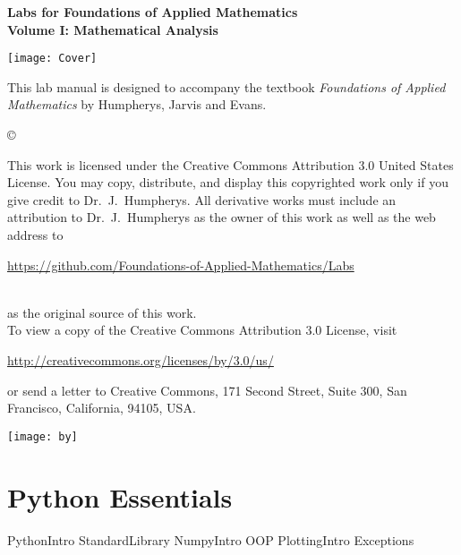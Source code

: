 \documentclass[nociteref]{SIAM-GH-book}
\begin{document}

\thispagestyle{empty} %

\begin{center}
{\huge \bf Labs for Foundations of Applied Mathematics} \\
\vspace{5mm}
{\Large \bf Volume I: Mathematical Analysis}
\vspace{20mm}

\texttt{[image: Cover]}
\end{center}
\frontmatter



\begin{thepreface} %

This lab manual is designed to accompany the textbook \emph{Foundations of Applied Mathematics} by Humpherys, Jarvis and Evans.

\vfill
\copyright{This work is licensed under the Creative Commons Attribution 3.0 United States
License.  You may copy, distribute, and display this copyrighted work only if you give
credit to Dr.~J.~Humpherys. All derivative works must include an attribution to Dr.~J.~Humpherys as the owner of this work as well as the web address to
\\\centerline{\url{https://github.com/Foundations-of-Applied-Mathematics/Labs}}\\as the original source of this work.
\\To view a copy of the Creative Commons Attribution 3.0 License, visit
\\\centerline{\url{http://creativecommons.org/licenses/by/3.0/us/}} or send a letter to Creative Commons, 171 Second Street, Suite 300, San Francisco, California, 94105, USA.}

\vfill
\centering\texttt{[image: by]}
\vfill
\end{thepreface}

\setcounter{tocdepth}{1}
\tableofcontents

\mainmatter %

\part{Python Essentials} %
{PythonIntro}
{StandardLibrary}
{NumpyIntro}
{OOP}
{PlottingIntro}
{Exceptions}
\end{document}
